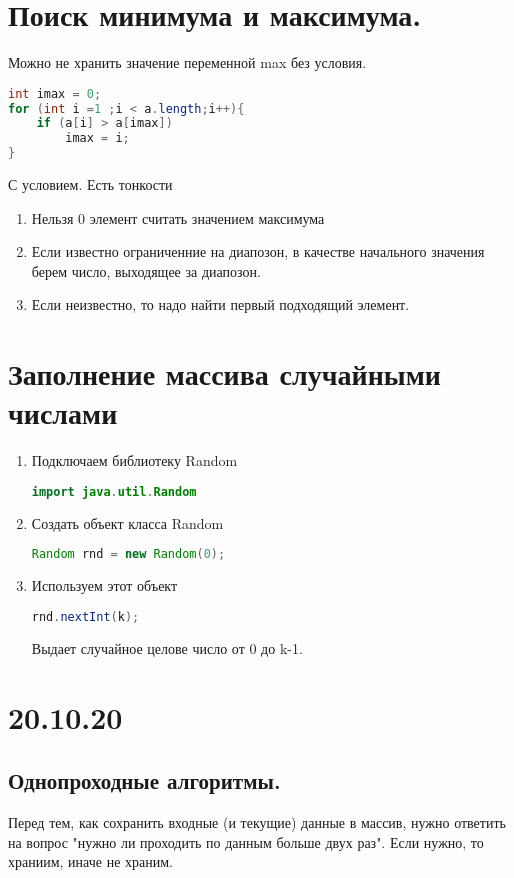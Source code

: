 \documentclass{article}
\begin{document}
\section{Поиск минимума и максимума.}
Можно не хранить значение переменной max без условия.
\begin{lstlisting}[language=Java] 
int imax = 0;
for (int i =1 ;i < a.length;i++){
    if (a[i] > a[imax])
        imax = i;
}
\end{lstlisting} 
С условием. Есть тонкости
\begin{enumerate}
    \item Нельзя 0 элемент считать значением максимума
    \item Если известно ограниченние на диапозон, в качестве начального значения берем число,
        выходящее за диапозон.
    \item Если неизвестно, то надо найти первый подходящий элемент.
\end{enumerate}
\section{Заполнение массива случайными числами}
\begin{enumerate}
    \item Подключаем библиотеку Random
        \begin{lstlisting}[language=Java] 
import java.util.Random 
        \end{lstlisting} 
        \item Создать объект класса Random
\begin{lstlisting}[language=Java] 
Random rnd = new Random(0);
\end{lstlisting} 
\item Используем этот объект
\begin{lstlisting}[language=Java] 
rnd.nextInt(k); 
\end{lstlisting} 
Выдает случайное целове число от 0 до k-1.
\end{enumerate}
\section{20.10.20}
\subsection{Однопроходные алгоритмы.}
Перед тем, как сохранить входные (и текущие) данные в массив, нужно ответить на вопрос "нужно ли проходить по данным больше двух раз". Если нужно, то храниим, иначе не храним.
\end{document}
